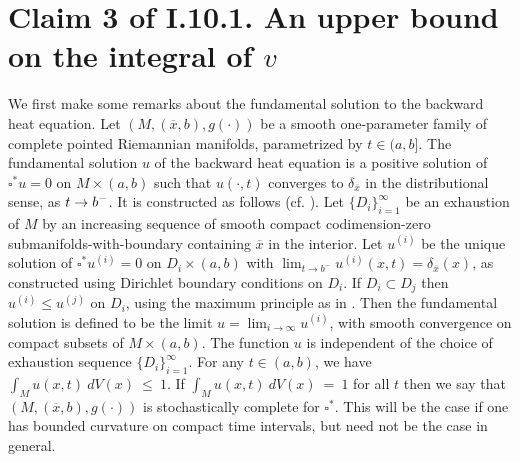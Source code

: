 \section{Claim 3 of I.10.1. An upper bound on the integral of $v$} \label{Claim3}

We first make some remarks about the fundamental solution to the
backward heat equation. Let $(M, (\overline{x}, b), g(\cdot))$ be a smooth
one-parameter family of complete pointed Riemannian manifolds,
parametrized by $t \in (a,b]$. The fundamental solution
$u$ of the backward heat equation is a positive solution of
$\square^* u = 0$ on $M \times  (a,b)$
such that
$ u(\cdot, t)$ converges  to $\delta_{\overline{x}}$
in the distributional sense,  as $t\rightarrow b^-$.
It is constructed as follows (cf. \cite[Section 3]{Dodziuk}).
Let $\{ D_i \}_{i=1}^\infty$ be an exhaustion of $M$ by
an increasing sequence of smooth compact codimension-zero
submanifolds-with-boundary containing $\overline{x}$ in
the interior. Let $u^{(i)}$ be the unique solution of
$\square^* u^{(i)} = 0$ on $D_i \times (a,b)$ with
$\lim_{t \rightarrow b^-} u^{(i)}(x, t) = \delta_{\overline{x}}(x)$,
as constructed using Dirichlet boundary conditions on $D_i$.
If $D_i \subset D_j$ then $u^{(i)} \le u^{(j)}$ on $D_i$,
using the maximum principle as in \cite[Lemma 3.1]{Dodziuk}.
Then the fundamental solution  is defined to be the limit
$u=\lim_{i \rightarrow \infty} u^{(i)}$, with smooth  convergence
 on compact subsets of $M \times  (a,b)$.
 The function $u$ is
independent of the choice of exhaustion sequence $\{D_i\}_{i=1}^\infty$.
For any $t \in (a,b)$, we have $\int_M u(x,t) \: dV(x) \: \le \: 1$.
If $\int_M u(x,t) \: dV(x) \: = \: 1$ for all $t$ then
we say that $(M, (\overline{x}, b), g(\cdot))$ is stochastically complete
for $\square^*$.
This will be the case if one has
bounded curvature on compact time intervals, but need not be the case in
general.

